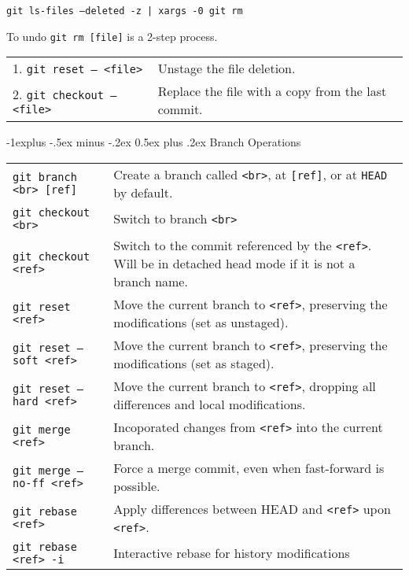 \documentclass[a4paper,10pt,landscape]{article}
\makeatletter
\renewcommand{\subsection}{\@startsection{subsection}{2}{0mm}%
                                {-1explus -.5ex minus -.2ex}%
                                {0.5ex plus .2ex}%
                                {\normalfont\normalsize\bfseries}}
\makeatother
\begin{document}
\begin{multicols}{3}
\begin{mdframed}[style=tip]
\vspace{1mm} 

\texttt{git ls-files --deleted -z | xargs -0 git rm}

\vspace{1.5mm} 

To undo \texttt{git rm [file]} is a 2-step process. 

\begin{tabular}{@{}p{\the\MyLen}%
                @{}p{\linewidth-\the\MyLen}@{}}
1. \texttt{git reset -- <file>} & Unstage the file deletion. \\
2. \texttt{git checkout -- <file>} & Replace the file with a copy from the last commit. \\
\end{tabular}
\end{mdframed}

\subsection{Branch Operations}
\begin{mdframed}[style=mystyle]
\begin{tabular}{@{}p{\the\MyLen}%
                @{}p{\linewidth-\the\MyLen}@{}}
\texttt{git branch <br> [ref]} & Create a branch called \texttt{<br>}, at \texttt{[ref]}, or at \texttt{HEAD} by default.\\
\texttt{git checkout <br>} & Switch to branch \texttt{<br>} \\
\texttt{git checkout <ref>} & Switch to the commit referenced by the \texttt{<ref>}. Will be in detached head mode if it is not a branch name. \\
\texttt{git reset <ref>} & Move the current branch to \texttt{<ref>}, preserving the modifications (set as unstaged). \\
\texttt{git reset --soft <ref>} & Move the current branch to \texttt{<ref>}, preserving the modifications (set as staged). \\
\texttt{git reset --hard <ref>} & Move the current branch to \texttt{<ref>}, dropping all differences and local modifications. \\
\texttt{git merge <ref>} & Incoporated changes from \texttt{<ref>} into the current branch. \\
\texttt{git merge --no-ff <ref>} & Force a merge commit, even when fast-forward is possible. \\
\texttt{git rebase <ref>} & Apply differences between HEAD and \texttt{<ref>} upon \texttt{<ref>}. \\
\texttt{git rebase <ref> -i} & Interactive rebase for history modifications \\
\end{tabular}
\end{mdframed}


\end{multicols}
\end{document}
